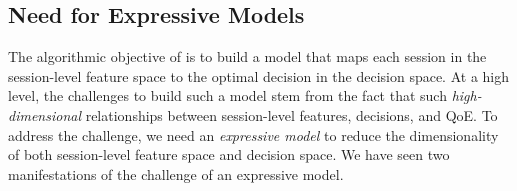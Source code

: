 \subsection{Need for Expressive Models}
\label{subsec:overview:challenge1}

The algorithmic objective of \ddn is to build a model that maps each 
session in the session-level feature space to the optimal decision in 
the decision space. 
At a high level, the challenges to build such a model stem from the fact
that such {\em high-dimensional} relationships between session-level 
features, decisions, and QoE.
To address the challenge, we need an {\em expressive model} to reduce
the dimensionality of both session-level feature space and decision space. 
We have seen two manifestations of the challenge of an expressive model.

